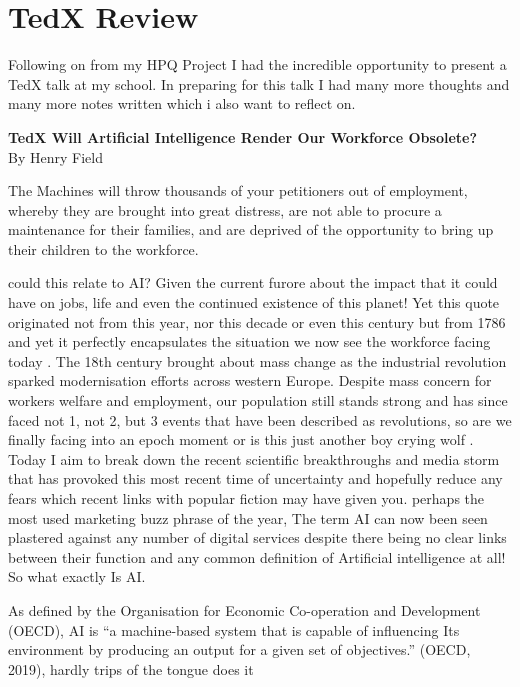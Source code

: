 \section{TedX Review}
\label{research:ReviewTedX}
Following on from my HPQ Project I had the incredible opportunity to present a TedX talk at my school. In preparing for this talk I had many more thoughts and many more notes written which i also want to reflect on.

\begin{center}
    \textbf{TedX Will Artificial Intelligence Render Our Workforce Obsolete?}\\
    By Henry Field \autocite{tedxtalksAIComingYour2024}
\end{center}

\sloppy
The Machines will throw thousands of your petitioners out of employment, whereby they are brought into great distress, are not able to procure a maintenance for their families, and are deprived of the opportunity to bring up their children to the workforce.

could this relate to AI? Given the current furore about the impact that it could have on jobs, life and even the continued existence of this planet!
Yet this quote originated not from this year, nor this decade or even this century but from 1786 and yet it perfectly encapsulates the situation we now see the workforce facing today . The 18th century brought about mass change as the industrial revolution sparked modernisation efforts across western Europe. Despite mass concern for workers welfare and employment, our population still stands strong and has since faced not 1, not 2, but 3 events that have been described as revolutions, so are we finally facing into an epoch moment or is this just another boy crying wolf . Today I aim to break down the recent scientific breakthroughs and media storm that has provoked this most recent time of uncertainty and hopefully reduce any fears which recent links with popular fiction may have given you.
perhaps the most used marketing buzz phrase of the year, The term AI can now been seen plastered against any number of digital services despite there being no clear links between their function and any common definition of Artificial intelligence at all! So what exactly Is AI.

As defined by the Organisation for Economic Co-operation and Development (OECD), AI is “a machine-based system that is capable of influencing Its environment by producing an output for a given set of objectives.” (OECD, 2019), hardly trips of the tongue does it

